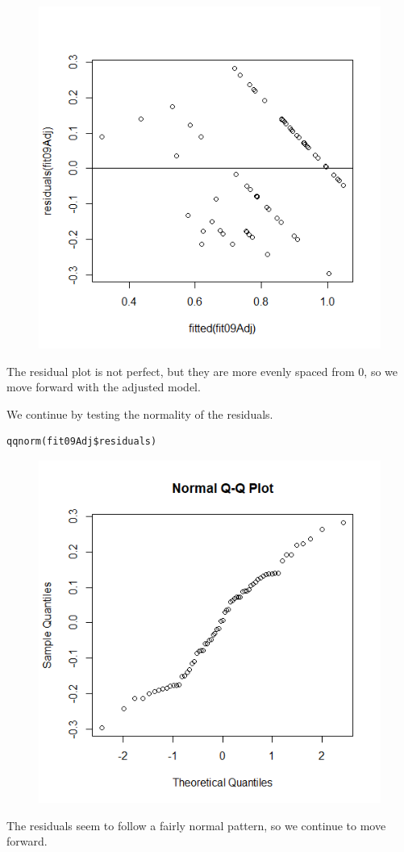 \documentclass[]{scrartcl}
\begin{document}
\normalsize
\begin{figure}[H]
	\centering
	\includegraphics[scale=.6]{2009Aresid.png}
\end{figure}
The residual plot is not perfect, but they are more evenly spaced from 0, so we move forward with the adjusted model.

We continue by testing the normality of the residuals.
\footnotesize
\begin{verbatim}
qqnorm(fit09Adj$residuals)
\end{verbatim}
\normalsize
\begin{figure}[H]
	\centering
	\includegraphics[scale=.6]{2009Anorm.png}
\end{figure}
The residuals seem to follow a fairly normal pattern, so we continue to move forward.
\end{document}
